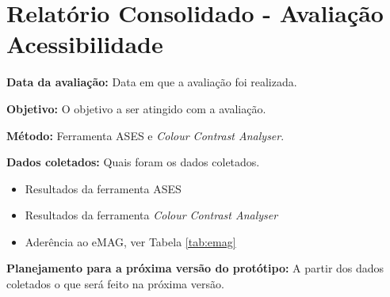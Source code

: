 \section{Relatório Consolidado - Avaliação Acessibilidade}

\flushleft \textbf{Data da avaliação:} 
Data em que a avaliação foi realizada.

\textbf{Objetivo:}
O objetivo a ser atingido com a avaliação.

\textbf{Método:}
Ferramenta ASES e \textit{Colour Contrast Analyser}.

\textbf{Dados coletados:}
Quais foram os dados coletados.

\begin{itemize}
 \item Resultados da ferramenta ASES 
 \item Resultados da ferramenta \textit{Colour Contrast Analyser}
 \item Aderência ao eMAG, ver Tabela \ref{tab:emag}
\end{itemize}


\textbf{Planejamento para a próxima versão do protótipo:}
A partir dos dados coletados o que será feito na próxima versão.

\vfill
\pagebreak

